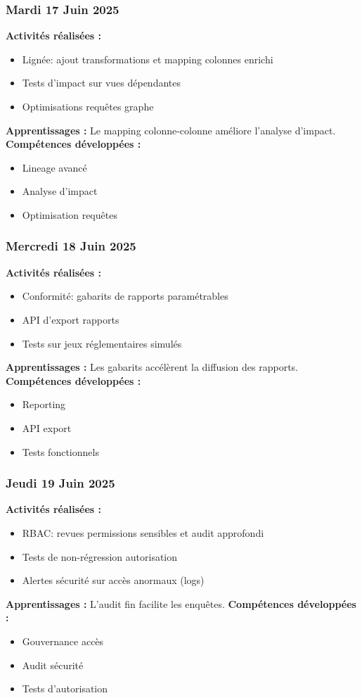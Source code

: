 \documentclass[12pt,a4paper]{article}
\begin{document}
\subsubsection{Mardi 17 Juin 2025}
\textbf{Activités réalisées :}
\begin{itemize}
    \item Lignée: ajout transformations et mapping colonnes enrichi
    \item Tests d'impact sur vues dépendantes
    \item Optimisations requêtes graphe
\end{itemize}
\textbf{Apprentissages :} Le mapping colonne-colonne améliore l'analyse d'impact.
\textbf{Compétences développées :}
\begin{itemize}
    \item Lineage avancé
    \item Analyse d'impact
    \item Optimisation requêtes
\end{itemize}

\subsubsection{Mercredi 18 Juin 2025}
\textbf{Activités réalisées :}
\begin{itemize}
    \item Conformité: gabarits de rapports paramétrables
    \item API d'export rapports
    \item Tests sur jeux réglementaires simulés
\end{itemize}
\textbf{Apprentissages :} Les gabarits accélèrent la diffusion des rapports.
\textbf{Compétences développées :}
\begin{itemize}
    \item Reporting
    \item API export
    \item Tests fonctionnels
\end{itemize}

\subsubsection{Jeudi 19 Juin 2025}
\textbf{Activités réalisées :}
\begin{itemize}
    \item RBAC: revues permissions sensibles et audit approfondi
    \item Tests de non-régression autorisation
    \item Alertes sécurité sur accès anormaux (logs)
\end{itemize}
\textbf{Apprentissages :} L'audit fin facilite les enquêtes.
\textbf{Compétences développées :}
\begin{itemize}
    \item Gouvernance accès
    \item Audit sécurité
    \item Tests d'autorisation
\end{itemize}
\end{document}
